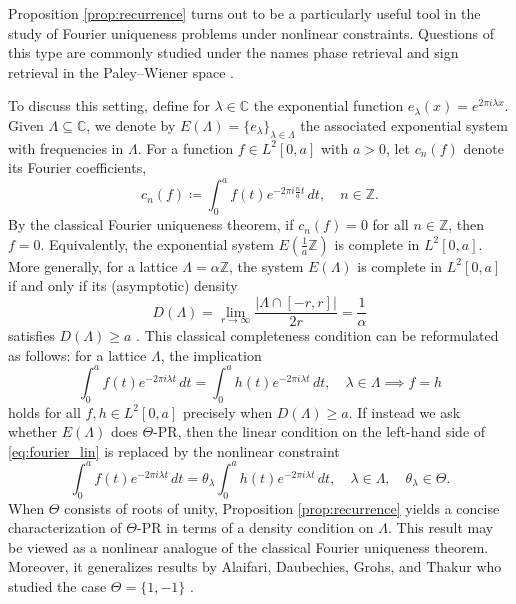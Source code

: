 \documentclass[reqno,a4paper,11pt]{amsart}
\numberwithin{equation}{section}
\def\Z{{\mathbb Z}}
\def\C{{\mathbb C}}
\newcommand\1{\mathds{1}}
\begin{document}
Proposition \ref{prop:recurrence} turns out to be a particularly useful tool in the study of Fourier uniqueness problems under nonlinear constraints. Questions of this type are commonly studied under the names phase retrieval and sign retrieval in the Paley–Wiener space \cite{thakur2011reconstruction,alaifari2017reconstructing,pohl2014phaseless,lai2021conjugate,akutowicz1956determination,jaming2022effect,alaifari2024unique,wellershoff2024phase}.

To discuss this setting, define for $\lambda \in \C$ the exponential function $e_\lambda(x)=e^{2\pi i \lambda x}$. Given $\Lambda \subseteq \C$, we denote by $E(\Lambda) = \{ e_\lambda \}_{\lambda \in \Lambda}$ the associated exponential system with frequencies in $\Lambda$. For a function $f \in L^2[0,a]$ with $a>0$, let $c_n(f)$ denote its Fourier coefficients,
$$
c_n(f) \coloneqq \int_0^a f(t) e^{-2\pi i \frac{n}{a} t} \, dt, \quad n \in \Z.
$$
By the classical Fourier uniqueness theorem, if $c_n(f) = 0$ for all $n \in \Z$, then $f = 0$. Equivalently, the exponential system $E(\tfrac{1}{a}\Z)$ is complete in $L^2[0,a]$. More generally, for a lattice $\Lambda = \alpha \Z$, the system $E(\Lambda)$ is complete in $L^2[0,a]$ if and only if its (asymptotic) density
$$
D(\Lambda) = \lim_{r \to \infty} \frac{|\Lambda \cap [-r,r]|}{2r} = \frac{1}{\alpha}
$$
satisfies $D(\Lambda) \ge a$ \cite{Young}. This classical completeness condition can be reformulated as follows: for a lattice $\Lambda$, the implication
\begin{equation}\label{eq:fourier_lin}
    \int_0^a f(t) e^{-2\pi i \lambda t} \, dt = \int_0^a h(t) e^{-2\pi i \lambda t} \, dt, \quad \lambda \in \Lambda \implies f=h
\end{equation}
holds for all $f,h \in L^2[0,a]$ precisely when $D(\Lambda) \ge a$. If instead we ask whether $E(\Lambda)$ does $\Theta$-PR, then the linear condition on the left-hand side of \eqref{eq:fourier_lin} is replaced by the nonlinear constraint
$$
\int_0^a f(t) e^{-2\pi i \lambda t} \, dt = \theta_\lambda \int_0^a h(t) e^{-2\pi i \lambda t} \, dt, \quad \lambda \in \Lambda, \quad \theta_\lambda \in \Theta.
$$
When $\Theta$ consists of roots of unity, Proposition \ref{prop:recurrence} yields a concise characterization of $\Theta$-PR in terms of a density condition on $\Lambda$. This result may be viewed as a nonlinear analogue of the classical Fourier uniqueness theorem. Moreover, it generalizes results by Alaifari, Daubechies, Grohs, and Thakur who studied the case $\Theta = \{1,-1 \}$ \cite{thakur2011reconstruction,alaifari2017reconstructing}.
\end{document}
